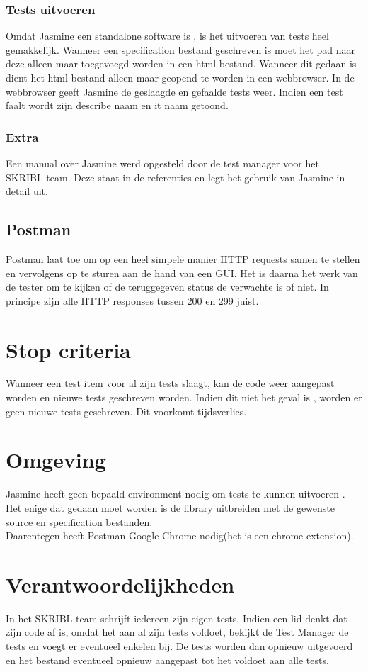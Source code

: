 \documentclass{article}
\begin{document}
\subsubsection{Tests uitvoeren}
Omdat Jasmine een standalone software is , is het uitvoeren van tests heel gemakkelijk. Wanneer een specification bestand geschreven is moet het pad naar deze alleen maar toegevoegd worden in een html bestand. Wanneer dit gedaan is dient het html bestand alleen maar geopend te worden in een webbrowser. In de webbrowser geeft Jasmine de geslaagde en gefaalde tests weer. Indien een test faalt wordt zijn describe naam en it naam getoond.

\subsubsection{Extra}
Een manual over Jasmine werd opgesteld door de test manager voor het SKRIBL-team. Deze staat in de referenties en legt het gebruik van Jasmine in detail uit. %

\subsection{Postman}
Postman laat toe om op een heel simpele manier HTTP requests samen te stellen en vervolgens op te sturen aan de hand van een GUI. Het is daarna het werk van de tester om te kijken of de teruggegeven status de verwachte is of niet. In principe zijn alle HTTP responses tussen 200 en 299 juist.


\section{Stop criteria}
Wanneer een test item voor al zijn tests slaagt, kan de code weer aangepast worden en nieuwe tests geschreven worden. Indien dit niet het geval is , worden er geen nieuwe tests geschreven. Dit voorkomt tijdsverlies.

\section{Omgeving}
Jasmine heeft geen bepaald environment nodig om tests te kunnen uitvoeren . Het enige dat gedaan moet worden is de library uitbreiden met de gewenste source en specification bestanden.
\\
Daarentegen heeft Postman Google Chrome nodig(het is een chrome extension). 

\section{Verantwoordelijkheden}
In het SKRIBL-team schrijft iedereen zijn eigen tests. Indien een lid denkt dat zijn code af is, omdat het aan al zijn tests voldoet, bekijkt de Test Manager de tests en voegt er eventueel enkelen bij. De tests worden dan opnieuw uitgevoerd en het bestand eventueel opnieuw aangepast tot het voldoet aan alle tests. 
\end{document}
